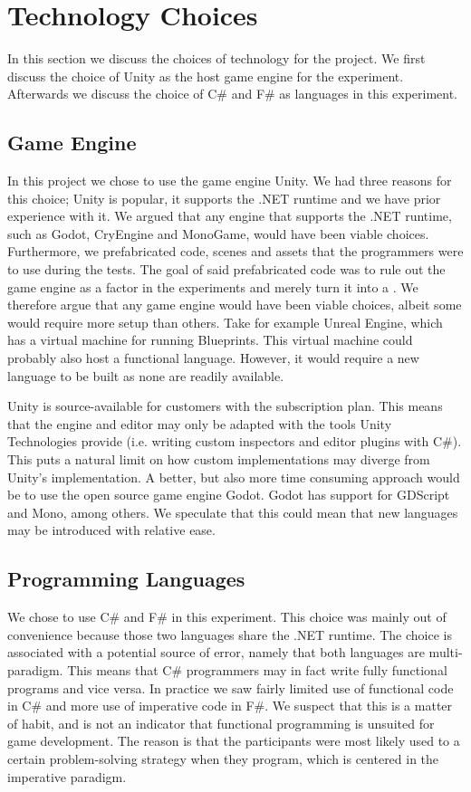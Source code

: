 \section{Technology Choices}
In this section we discuss the choices of technology for the project. We first discuss the choice of Unity as the host game engine for the experiment. Afterwards we discuss the choice of C\# and F\# as languages in this experiment.

\subsection{Game Engine}
In this project we chose to use the game engine Unity. We had three reasons for this choice; Unity is popular, it supports the .NET runtime and we have prior experience with it. We argued that any engine that supports the .NET runtime, such as Godot, CryEngine and MonoGame, would have been viable choices. Furthermore, we prefabricated code, scenes and assets that the programmers were to use during the tests. The goal of said prefabricated code was to rule out the game engine as a factor in the experiments and merely turn it into a .
We therefore argue that any game engine would have been viable choices, albeit some would require more setup than others. Take for example Unreal Engine, which has a virtual machine for running Blueprints\cite{unreal2019blueprintNativiziation}. This virtual machine could probably also host a functional language. However, it would require a new language to be built as none are readily available.

Unity is source-available for customers with the  subscription plan. This means that the engine and editor may only be adapted with the tools Unity Technologies provide (i.e. writing custom inspectors and editor plugins with C\#). This puts a natural limit on how  custom implementations may diverge from Unity's implementation. A better, but also more time consuming approach would be to use the open source game engine Godot. Godot has support for GDScript and Mono, among others. We speculate that this could mean that new languages may be introduced with relative ease.

\subsection{Programming Languages}
We chose to use C\# and F\# in this experiment. This choice was mainly out of convenience because those two languages share the .NET runtime. The choice is associated with a potential source of error, namely that both languages are multi-paradigm. This means that C\# programmers may in fact write fully functional programs and vice versa. In practice we saw fairly limited use of functional code in C\# and more use of imperative code in F\#. We suspect that this is a matter of habit, and is not an indicator that functional programming is unsuited for game development. The reason is that the participants were most likely used to a certain problem-solving strategy when they program, which is centered in the imperative paradigm. 

